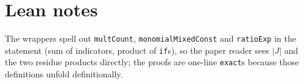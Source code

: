 \documentclass[11pt]{article}
\begin{document}
\section{Lean notes}
The wrappers spell out \texttt{multCount}, \texttt{monomialMixedConst} and \texttt{ratioExp} in the
statement (sum of indicators, product of \texttt{if}s), so the paper reader sees $|J|$ and the two
residue products directly; the proofs are one-line \texttt{exact}s because those definitions
unfold definitionally.
\end{document}
